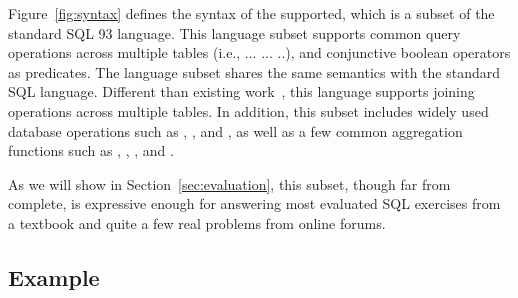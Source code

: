 Figure~\ref{fig:syntax} defines the syntax of the supported, which
is a subset of the standard SQL 93 language. This language subset
supports common query operations across multiple tables (i.e.,
 ... ... ..), and 
conjunctive boolean operators as predicates. The language
subset shares the same semantics with the standard SQL language.
Different than existing work~\cite{DasSarma:2010}, this language supports
joining operations across multiple tables. In addition, this subset includes
widely used database operations such as ,
, and , as
well as a few common aggregation functions such as , ,
, and .

As we will show in Section~\ref{sec:evaluation}, this
subset, though far from complete, is expressive enough for answering
most evaluated SQL exercises from a textbook and quite a few real problems
from online forums.

\subsection{Example}
\label{sec:example}


